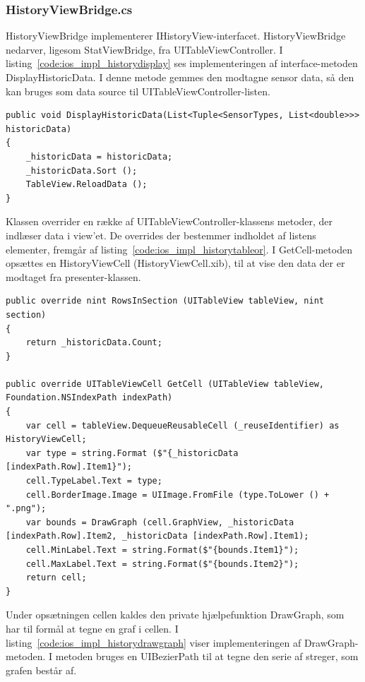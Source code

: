 \subsubsection{HistoryViewBridge.cs}
HistoryViewBridge implementerer IHistoryView-interfacet. HistoryViewBridge nedarver, ligesom StatViewBridge, fra UITableViewController. I listing~\ref{code:ios_impl_historydisplay} ses implementeringen af interface-metoden DisplayHistoricData. I denne metode gemmes den modtagne sensor data, så den kan bruges som data source til UITableViewController-listen.

\begin{lstlisting}[caption={DisplayHistoricData(...)},label={code:ios_impl_historydisplay}]
public void DisplayHistoricData(List<Tuple<SensorTypes, List<double>>> historicData)
{
	_historicData = historicData;
	_historicData.Sort ();
	TableView.ReloadData ();
}
\end{lstlisting}

Klassen overrider en række af UITableViewController-klassens metoder, der indlæser data i view'et. De overrides der bestemmer indholdet af listens elementer, fremgår af listing~\ref{code:ios_impl_historytableor}. I GetCell-metoden opsættes en HistoryViewCell (HistoryViewCell.xib), til at vise den data der er modtaget fra presenter-klassen.

\begin{lstlisting}[caption={Overrides af UITableViewController-metoder i HistoryViewBridge},label={code:ios_impl_historytableor}]
public override nint RowsInSection (UITableView tableView, nint section)
{
	return _historicData.Count;
}

public override UITableViewCell GetCell (UITableView tableView, Foundation.NSIndexPath indexPath)
{
	var cell = tableView.DequeueReusableCell (_reuseIdentifier) as HistoryViewCell;
	var type = string.Format ($"{_historicData [indexPath.Row].Item1}");
	cell.TypeLabel.Text = type;
	cell.BorderImage.Image = UIImage.FromFile (type.ToLower () + ".png");
	var bounds = DrawGraph (cell.GraphView, _historicData [indexPath.Row].Item2, _historicData [indexPath.Row].Item1);
	cell.MinLabel.Text = string.Format($"{bounds.Item1}");
	cell.MaxLabel.Text = string.Format($"{bounds.Item2}");
	return cell;
}
\end{lstlisting}

Under opsætningen cellen kaldes den private hjælpefunktion DrawGraph, som har til formål at tegne en graf i cellen. I listing~\ref{code:ios_impl_historydrawgraph} viser implementeringen af DrawGraph-metoden. I metoden bruges en UIBezierPath til at tegne den serie af streger, som grafen består af.

